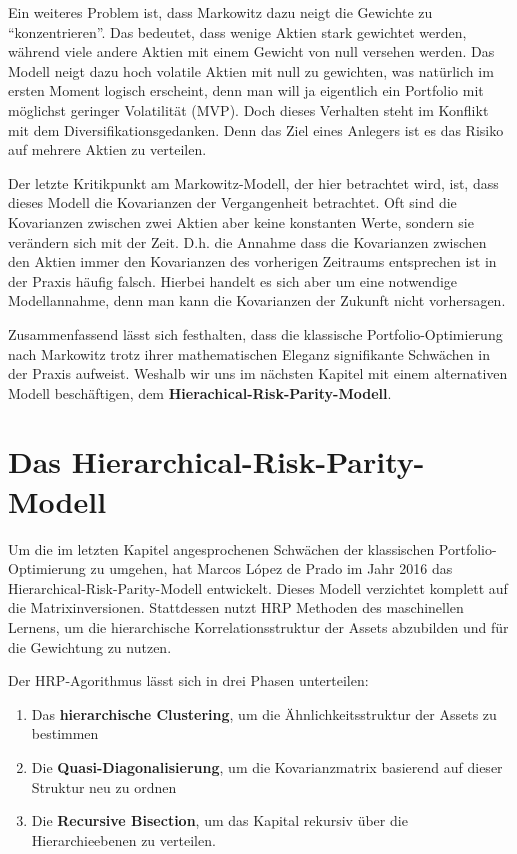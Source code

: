 \documentclass[parskip=half]{scrartcl}
\begin{document}
	Ein weiteres Problem ist, dass Markowitz dazu neigt die Gewichte zu "`konzentrieren"'. Das bedeutet, dass wenige Aktien stark gewichtet werden, während viele andere Aktien mit einem Gewicht von null versehen werden. Das Modell neigt dazu hoch volatile Aktien mit null zu gewichten, was natürlich im ersten Moment logisch erscheint, denn man will ja eigentlich ein Portfolio mit möglichst geringer Volatilität (MVP). Doch dieses Verhalten steht im Konflikt mit dem Diversifikationsgedanken. Denn das Ziel eines Anlegers ist es das Risiko auf mehrere Aktien zu verteilen. 
	
	Der letzte Kritikpunkt am Markowitz-Modell, der hier betrachtet wird, ist, dass dieses Modell die Kovarianzen der Vergangenheit betrachtet. Oft sind die Kovarianzen zwischen zwei Aktien aber keine konstanten Werte, sondern sie verändern sich mit der Zeit. D.h. die Annahme dass die Kovarianzen zwischen den Aktien immer den Kovarianzen des vorherigen Zeitraums entsprechen ist in der Praxis häufig falsch. Hierbei handelt es sich aber um eine notwendige Modellannahme, denn man kann die Kovarianzen der Zukunft nicht vorhersagen.
	
	Zusammenfassend lässt sich festhalten, dass die klassische Portfolio-Optimierung nach Markowitz trotz ihrer mathematischen Eleganz signifikante Schwächen in der Praxis aufweist. Weshalb wir uns im nächsten Kapitel mit einem alternativen Modell beschäftigen, dem \textbf{Hierachical-Risk-Parity-Modell}.
	
	\clearpage
	
	\section{Das Hierarchical-Risk-Parity-Modell}
	
	Um die im letzten Kapitel angesprochenen Schwächen der klassischen Portfolio-Optimierung zu umgehen, hat Marcos López de Prado im Jahr 2016 das Hierarchical-Risk-Parity-Modell entwickelt. Dieses Modell verzichtet komplett auf die Matrixinversionen. Stattdessen nutzt HRP Methoden des maschinellen Lernens, um die hierarchische Korrelationsstruktur der Assets abzubilden und für die Gewichtung zu nutzen.
	
	Der HRP-Agorithmus lässt sich in drei Phasen unterteilen:
	
	\begin{enumerate}
		\item Das \textbf{hierarchische Clustering}, um die Ähnlichkeitsstruktur der Assets zu bestimmen
		\item Die \textbf{Quasi-Diagonalisierung}, um die Kovarianzmatrix basierend auf dieser Struktur neu zu ordnen
		\item Die \textbf{Recursive Bisection}, um das Kapital rekursiv über die Hierarchieebenen zu verteilen.
	\end{enumerate}
	
\end{document}
